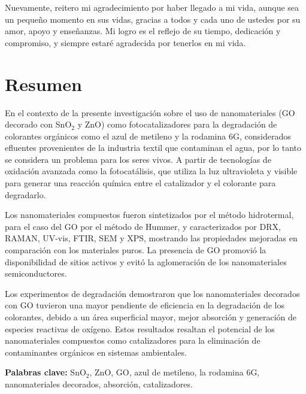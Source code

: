 \documentclass[12pt]{article}
\begin{document}
Nuevamente, reitero mi agradecimiento por haber llegado a mi vida, aunque sea un pequeño momento en sus vidas, gracias a todos y cada uno de ustedes por su amor, apoyo y enseñanzas. Mi logro es el reflejo de su tiempo, dedicación y compromiso, y siempre estaré agradecida por tenerlos en mi vida.\vspace{1em} %

\newpage
\section*{Resumen}

En el contexto de la presente investigación sobre el uso de nanomateriales (GO decorado con SnO$\displaystyle _{2}$ y ZnO) como fotocatalizadores para la degradación de colorantes orgánicos como el azul de metileno y la rodamina 6G, considerados efluentes provenientes de la industria textil que contaminan el agua, por lo tanto se considera un problema para los seres vivos. A partir de tecnologías de oxidación avanzada como la fotocatálisis, que utiliza la luz ultravioleta y visible para generar una reacción química entre el catalizador y el colorante para degradarlo.\vspace{1em} %

Los nanomateriales compuestos fueron sintetizados por el método hidrotermal, para el caso del GO por el método de Hummer, y caracterizados por DRX, RAMAN, UV-vis, FTIR, SEM y XPS, mostrando las propiedades mejoradas en comparación con los materiales puros. La presencia de GO promovió la disponibilidad de sitios activos y evitó la aglomeración de los nanomateriales semiconductores.\vspace{1em} %

Los experimentos de degradación demostraron que los nanomateriales decorados con GO tuvieron una mayor pendiente de eficiencia en la degradación de los colorantes, debido a un área superficial mayor, mejor absorción y generación de especies reactivas de oxígeno. Estos resultados resaltan el potencial de los nanomateriales compuestos como catalizadores para la eliminación de contaminantes orgánicos en sistemas ambientales.\vspace{1em} %

\textbf{Palabras clave:} SnO$\displaystyle _{2}$, ZnO, GO, azul de metileno, la rodamina 6G, nanomateriales decorados, absorción, catalizadores.
\newpage
\end{document}
